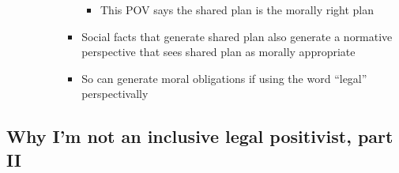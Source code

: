 \begin{itemize}
\begin{itemize}
\begin{enumerate}
\begin{itemize}
        \begin{itemize}
        \tightlist
        \item
          This POV says the shared plan is the morally right plan
        \end{itemize}
      \item
        Social facts that generate shared plan also generate a normative
        perspective that sees shared plan as morally appropriate
      \item
        So can generate moral obligations if using the word ``legal''
        perspectivally
      \end{itemize}
    \end{enumerate}
  \end{itemize}
\end{itemize}

\hypertarget{why-im-not-an-inclusive-legal-positivist-part-ii}{%
\subsection{Why I'm not an inclusive legal positivist, part
II}\label{why-im-not-an-inclusive-legal-positivist-part-ii}}

